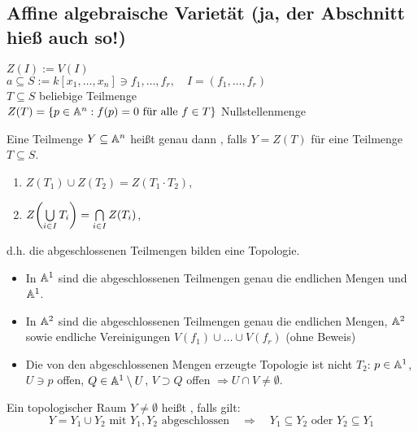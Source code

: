 \subsection{Affine algebraische Varietät (ja, der Abschnitt hieß auch so!)}
\label{sub:abschnitt_1.2}
	$Z(I) := V(I)$		 \\
	$a \subseteq S := k[x_1,\dots,x_n] \ni f_1, \dots, f_r, \quad I = (f_1,\dots, f_r)$ \\
	$T \subseteq S$ beliebige Teilmenge \\
	$Z(T) = \{p \in \mathbb{A}^n : f(p) = 0 \text{ für alle } f \in T\}$ Nullstellenmenge
	
\begin{defn}
	Eine Teilmenge $Y \subseteq \mathbb{A}^n$ heißt genau dann , falls $Y = Z(T)$ für eine Teilmenge $T \subseteq S$. 
\end{defn}

\begin{satz}
	\begin{enumerate}[1)]
		\item $Z(T_1) \cup Z(T_2) = Z(T_1 \cdot T_2)$,
		\item $Z \enbrace*{\bigcup\limits_{i \in I} T_i} = \bigcap\limits_{i \in I} Z(T_i)$,
	\end{enumerate}
	d.h. die abgeschlossenen Teilmengen bilden eine Topologie.
\end{satz}

\begin{bsp}
	\begin{itemize}
		\item In $\mathbb{A}^1$ sind die abgeschlossenen Teilmengen genau die endlichen Mengen und $\mathbb{A}^1$.
		\item In $\mathbb{A}^2$ sind die abgeschlossenen Teilmengen genau die endlichen Mengen, $\mathbb{A}^2$ sowie endliche Vereinigungen $V(f_1) \cup \dots \cup V(f_r)$ (ohne Beweis)
		\item Die von den abgeschlossenen Mengen erzeugte Topologie ist nicht $T_2$: $p \in \mathbb{A}^1$, $U \ni p$ offen, $Q \in \mathbb{A}^1 \setminus U$, $V \supset Q$ offen $\Rightarrow U \cap V \neq \emptyset$.
	\end{itemize}
\end{bsp}
	
\begin{defn}
	Ein topologischer Raum $Y \neq \emptyset$ heißt , falls gilt:
	\[Y = Y_1 \cup Y_2 \text{ mit } Y_1,Y_2 \text{ abgeschlossen} \quad \Rightarrow \quad Y_1 \subseteq Y_2 \text{ oder } Y_2 \subseteq Y_1 \]
\end{defn}


